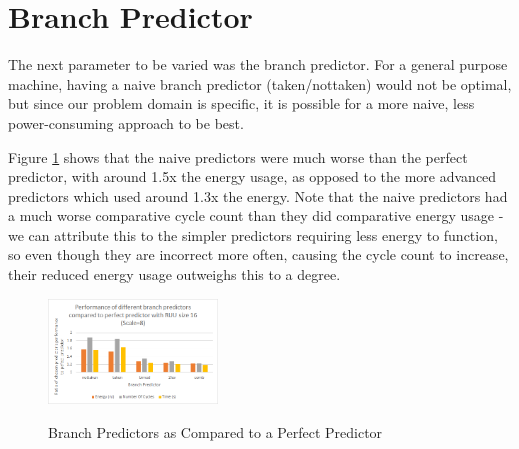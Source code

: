 \documentclass[letterpaper, 10 pt, conference]{ieeeconf}  %
\begin{document}
\section{Branch Predictor}
The next parameter to be varied was the branch predictor. For a general purpose machine, having a naive branch predictor (taken/nottaken) would not be optimal, but since our problem domain is specific, it is possible for a more naive, less power-consuming approach to be best. 

Figure \ref{fig:bpred} shows that the naive predictors were much worse than the perfect predictor, with around 1.5x the energy usage, as opposed to the more advanced predictors which used around 1.3x the energy. Note that the naive predictors had a much worse comparative cycle count than they did comparative energy usage - we can attribute this to the simpler predictors requiring less energy to function, so even though they are incorrect more often, causing the cycle count to increase, their reduced energy usage outweighs this to a degree.

\begin{figure}[h]
	\begin{center}
	\includegraphics[width=0.4\textwidth]{bpred.png}\\
  	\caption{Branch Predictors as Compared to a Perfect Predictor}
    \label{fig:bpred}
    \end{center}
\end{figure}
\end{document}
